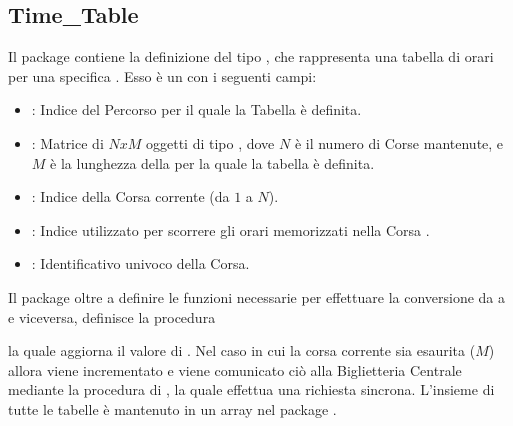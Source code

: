 	\subsection{Time\_Table}
	
	Il package  contiene la definizione del tipo , che rappresenta una tabella di orari per una specifica . Esso è un  con i seguenti campi:
	\begin{itemize}
		\item {}: Indice del Percorso per il quale la Tabella è definita.
		\item {}: Matrice di $NxM$ oggetti di tipo , dove $N$ è il numero di Corse mantenute, e $M$ è la lunghezza della  per la quale la tabella è definita.
		\item {}: Indice della Corsa corrente (da $1$ a $N$).
		\item {}: Indice utilizzato per scorrere gli orari memorizzati nella Corsa .
		\item {}: Identificativo univoco della Corsa. 
	\end{itemize}
	
	Il package oltre a definire le funzioni necessarie per effettuare la conversione da  a  e viceversa, definisce la procedura 
\begin{center}
\end{center}
 la quale aggiorna il valore di . Nel caso in cui la corsa corrente  sia esaurita ($M$) allora  viene incrementato e viene comunicato ciò alla Biglietteria Centrale mediante la procedura  di , la quale effettua una richiesta sincrona.
	L'insieme di tutte le tabelle è mantenuto in un array nel package .
